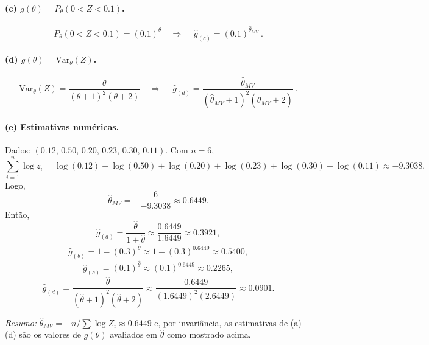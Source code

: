 \paragraph{(c) $g(\theta)=P_\theta(0<Z<0.1)$.}
\[
P_\theta(0<Z<0.1)=(0.1)^\theta
\quad\Longrightarrow\quad
\boxed{\ \widehat g_{(c)}=(0.1)^{\widehat\theta_{MV}}\ }.
\]

\paragraph{(d) $g(\theta)=\mathrm{Var}_\theta(Z)$.}
\[
\mathrm{Var}_\theta(Z)=\frac{\theta}{(\theta+1)^2(\theta+2)}
\quad\Longrightarrow\quad
\boxed{\ \widehat g_{(d)}=\frac{\widehat\theta_{MV}}
{(\widehat\theta_{MV}+1)^2(\widehat\theta_{MV}+2)}\ }.
\]

\paragraph{(e) Estimativas numéricas.}
Dados: $(0.12,\,0.50,\,0.20,\,0.23,\,0.30,\,0.11)$.
Com $n=6$,
\[
\sum_{i=1}^n\log z_i
=\log(0.12)+\log(0.50)+\log(0.20)+\log(0.23)+\log(0.30)+\log(0.11)
\approx -9.3038.
\]
Logo,
\[
\widehat\theta_{MV}
=-\frac{6}{-9.3038}\approx 0.6449.
\]
Então,
\[
\widehat g_{(a)}=\frac{\widehat\theta}{1+\widehat\theta}
\approx \frac{0.6449}{1.6449}\approx 0.3921,
\]
\[
\widehat g_{(b)}=1-(0.3)^{\widehat\theta}
\approx 1-(0.3)^{0.6449}\approx 0.5400,
\]
\[
\widehat g_{(c)}=(0.1)^{\widehat\theta}
\approx (0.1)^{0.6449}\approx 0.2265,
\]
\[
\widehat g_{(d)}=\frac{\widehat\theta}{(\widehat\theta+1)^2(\widehat\theta+2)}
\approx \frac{0.6449}{(1.6449)^2(2.6449)}\approx 0.0901.
\]

\medskip
\noindent
\textit{Resumo:}\;
$\widehat\theta_{MV}=-n/\sum\log Z_i\approx 0.6449$ e,
por invariância, as estimativas de (a)--(d) são os valores de $g(\theta)$
avaliados em $\widehat\theta$ como mostrado acima.
